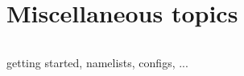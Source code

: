\documentclass[../main/SI3_manual]{subfiles}
\begin{document}

\chapter{Miscellaneous topics}
\label{chap:MIS}
\chaptertoc

\newpage
$\ $\newline    %

getting started, namelists, configs, ...
\end{document}
